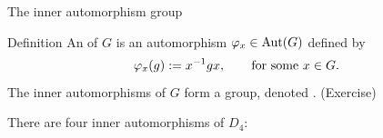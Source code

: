 \documentclass[8pt, handout]{beamer}
\newcommand{\Pause}{}      %
\begin{document}

\begin{frame}{The inner automorphism group}
  
  \begin{block}{Definition}
    An  of $G$ is an automorphism
    $\varphi_x\in\operatorname{Aut}(G)$ defined by \vspace{-1mm}
    \[
    \varphi_x(g):=x^{-1}gx,\qquad\text{for some $x\in G$}. \vspace{-1mm}
    \]
    \Pause The inner automorphisms of $G$ form a group, denoted
    . (Exercise)
  \end{block}
  
  \smallskip\Pause
  
  There are four inner automorphisms of $D_4$: \vspace{-3mm}


\end{frame}
\end{document}
